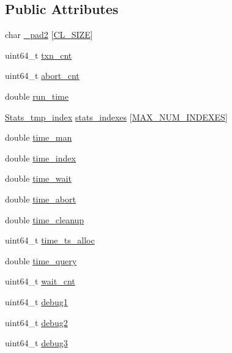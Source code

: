 \subsection*{Public Attributes}
\begin{DoxyCompactItemize}
\item 
char \hyperlink{classStats__thd_a69e6cc9995500f6ff46c4ac6a2a2c701}{\+\_\+pad2} \mbox{[}\hyperlink{config_8h_aa18ff96566bf8c1f4cd38c1e7bc4ca80}{C\+L\+\_\+\+S\+I\+ZE}\mbox{]}
\item 
uint64\+\_\+t \hyperlink{classStats__thd_a49a60b955252ba65d755d0c091c4f89e}{txn\+\_\+cnt}
\item 
uint64\+\_\+t \hyperlink{classStats__thd_aef6a88691a6f8a7fab529c69fc18695d}{abort\+\_\+cnt}
\item 
double \hyperlink{classStats__thd_a8b12797a3e9861fbdb5b87b7f4bed1fa}{run\+\_\+time}
\item 
\hyperlink{classStats__tmp__index}{Stats\+\_\+tmp\+\_\+index} \hyperlink{classStats__thd_ad4fe9ff08a5989c3c4852aadd17f3d69}{stats\+\_\+indexes} \mbox{[}\hyperlink{stats_8h_aefb0708b15ac381fb0f0d94c3ca6904d}{M\+A\+X\+\_\+\+N\+U\+M\+\_\+\+I\+N\+D\+E\+X\+ES}\mbox{]}
\item 
double \hyperlink{classStats__thd_a394ab002a85773b523ed4f0d4847cf07}{time\+\_\+man}
\item 
double \hyperlink{classStats__thd_a34b94d73fab82879dd2ad588ba6b5a88}{time\+\_\+index}
\item 
double \hyperlink{classStats__thd_ae7cff905febb34aeae34e57d8e5fb5f2}{time\+\_\+wait}
\item 
double \hyperlink{classStats__thd_a86b7a856496a2a8c091a227580770cd4}{time\+\_\+abort}
\item 
double \hyperlink{classStats__thd_a9863a5528c79f788e1b03c7f4c5614de}{time\+\_\+cleanup}
\item 
uint64\+\_\+t \hyperlink{classStats__thd_aac4564be92e99f7096e4a134361d0b76}{time\+\_\+ts\+\_\+alloc}
\item 
double \hyperlink{classStats__thd_a844362ff64eef3730588efd28d41c0e0}{time\+\_\+query}
\item 
uint64\+\_\+t \hyperlink{classStats__thd_af8910fbaa615ab9753db185927a5d169}{wait\+\_\+cnt}
\item 
uint64\+\_\+t \hyperlink{classStats__thd_a0ad99647bac316dbd7be1682eb3fad94}{debug1}
\item 
uint64\+\_\+t \hyperlink{classStats__thd_a093cee55ae1bad32e5eaf5f68140a142}{debug2}
\item 
uint64\+\_\+t \hyperlink{classStats__thd_a7f4cbf859001c12450801b2ca211be7d}{debug3}

\end{DoxyCompactItemize}
